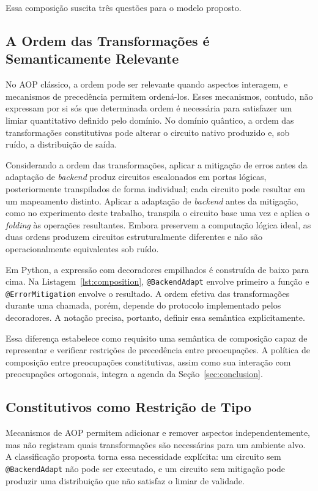 \documentclass[sigconf]{acmart}
\begin{document}
Essa composição suscita três questões para o modelo proposto.

\subsection{A Ordem das Transformações é Semanticamente Relevante}

No AOP clássico, a ordem pode ser relevante quando aspectos interagem, e mecanismos de precedência permitem ordená-los. Esses mecanismos, contudo, não expressam por si sós que determinada ordem é necessária para satisfazer um limiar quantitativo definido pelo domínio. No domínio quântico, a ordem das transformações constitutivas pode alterar o circuito nativo produzido e, sob ruído, a distribuição de saída.

Considerando a ordem das transformações, aplicar a mitigação de erros antes da adaptação de \textit{backend} produz circuitos escalonados em portas lógicas, posteriormente transpilados de forma individual; cada circuito pode resultar em um mapeamento distinto. Aplicar a adaptação de \textit{backend} antes da mitigação, como no experimento deste trabalho, transpila o circuito base uma vez e aplica o \textit{folding} às operações resultantes. Embora preservem a computação lógica ideal, as duas ordens produzem circuitos estruturalmente diferentes e não são operacionalmente equivalentes sob ruído.

Em Python, a expressão com decoradores empilhados é construída de baixo para cima. Na Listagem~\ref{lst:composition}, \texttt{@BackendAdapt} envolve primeiro a função e \texttt{@ErrorMitigation} envolve o resultado. A ordem efetiva das transformações durante uma chamada, porém, depende do protocolo implementado pelos decoradores. A notação precisa, portanto, definir essa semântica explicitamente.

Essa diferença estabelece como requisito uma semântica de composição capaz de representar e verificar restrições de precedência entre preocupações. A política de composição entre preocupações constitutivas, assim como sua interação com preocupações ortogonais, integra a agenda da Seção~\ref{sec:conclusion}.

\subsection{Constitutivos como Restrição de Tipo}

Mecanismos de AOP permitem adicionar e remover aspectos independentemente, mas não registram quais transformações são necessárias para um ambiente alvo. A classificação proposta torna essa necessidade explícita: um circuito sem \texttt{@BackendAdapt} não pode ser executado, e um circuito sem mitigação pode produzir uma distribuição que não satisfaz o limiar de validade.
\end{document}
